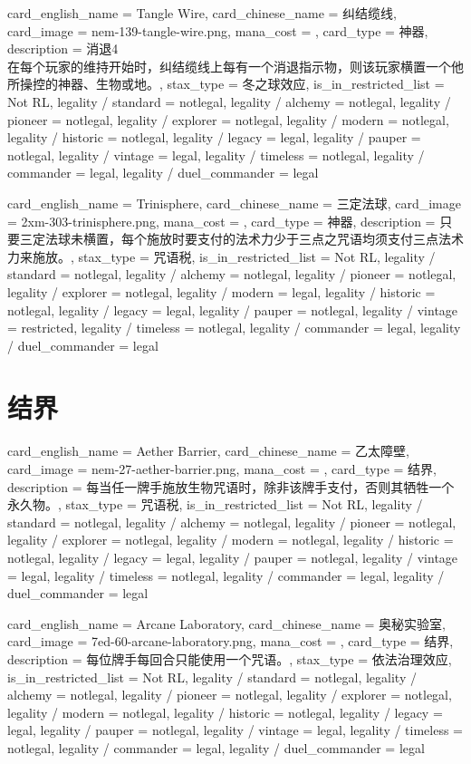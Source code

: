 \documentclass[lang = cn, color = black, 10pt]{AllThatStax}
\begin{document}
\card
{
	card_english_name = {Tangle Wire},
	card_chinese_name = {纠结缆线},
	card_image = nem-139-tangle-wire.png,
	mana_cost = ,
	card_type = 神器,
	description = {消退4\\
在每个玩家的维持开始时，纠结缆线上每有一个消退指示物，则该玩家横置一个他所操控的神器、生物或地。},
	stax_type = 冬之球效应,
	is_in_restricted_list = Not RL,
	legality / standard = notlegal,
	legality / alchemy = notlegal,
	legality / pioneer = notlegal,
	legality / explorer = notlegal,
	legality / modern = notlegal,
	legality / historic = notlegal,
	legality / legacy = legal,
	legality / pauper = notlegal,
	legality / vintage = legal,
	legality / timeless = notlegal,
	legality / commander = legal,
	legality / duel_commander = legal
}

\card
{
	card_english_name = {Trinisphere},
	card_chinese_name = {三定法球},
	card_image = 2xm-303-trinisphere.png,
	mana_cost = ,
	card_type = 神器,
	description = {只要三定法球未横置，每个施放时要支付的法术力少于三点之咒语均须支付三点法术力来施放。},
	stax_type = 咒语税,
	is_in_restricted_list = Not RL,
	legality / standard = notlegal,
	legality / alchemy = notlegal,
	legality / pioneer = notlegal,
	legality / explorer = notlegal,
	legality / modern = legal,
	legality / historic = notlegal,
	legality / legacy = legal,
	legality / pauper = notlegal,
	legality / vintage = restricted,
	legality / timeless = notlegal,
	legality / commander = legal,
	legality / duel_commander = legal
}

\section{结界}

\card
{
	card_english_name = {Aether Barrier},
	card_chinese_name = {乙太障壁},
	card_image = nem-27-aether-barrier.png,
	mana_cost = ,
	card_type = 结界,
	description = {每当任一牌手施放生物咒语时，除非该牌手支付，否则其牺牲一个永久物。},
	stax_type = 咒语税,
	is_in_restricted_list = Not RL,
	legality / standard = notlegal,
	legality / alchemy = notlegal,
	legality / pioneer = notlegal,
	legality / explorer = notlegal,
	legality / modern = notlegal,
	legality / historic = notlegal,
	legality / legacy = legal,
	legality / pauper = notlegal,
	legality / vintage = legal,
	legality / timeless = notlegal,
	legality / commander = legal,
	legality / duel_commander = legal
}

\card
{
	card_english_name = {Arcane Laboratory},
	card_chinese_name = {奥秘实验室},
	card_image = 7ed-60-arcane-laboratory.png,
	mana_cost = ,
	card_type = 结界,
	description = {每位牌手每回合只能使用一个咒语。},
	stax_type = 依法治理效应,
	is_in_restricted_list = Not RL,
	legality / standard = notlegal,
	legality / alchemy = notlegal,
	legality / pioneer = notlegal,
	legality / explorer = notlegal,
	legality / modern = notlegal,
	legality / historic = notlegal,
	legality / legacy = legal,
	legality / pauper = notlegal,
	legality / vintage = legal,
	legality / timeless = notlegal,
	legality / commander = legal,
	legality / duel_commander = legal
}
\end{document}

